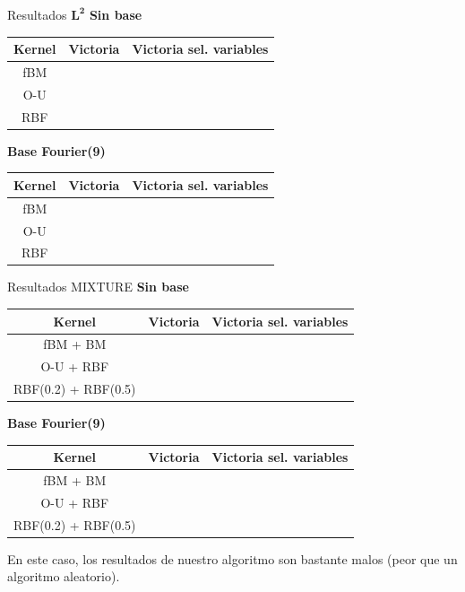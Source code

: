 \documentclass[10pt, spanish, professionalfonts]{beamer}
\newcommand{\cmark}{\ding{51}}%
\newcommand{\xmark}{\ding{55}}%
\begin{document}
\begin{frame}{Resultados \(\boldsymbol{L^2}\)}
\textbf{Sin base}
  \begin{table}
    \begin{tabular}{c|cc}
      Kernel & Victoria & Victoria sel. variables \\ \hline
      fBM & \xmark & \xmark\\
      O-U & \cmark & \xmark\\
      RBF & \cmark & \cmark
    \end{tabular}
  \end{table}

  \textbf{Base Fourier(9)}
  \begin{table}
    \begin{tabular}{c|cc}
      Kernel & Victoria & Victoria sel. variables \\ \hline
      fBM & \xmark &  \cmark\\
      O-U & \xmark & \cmark\\
      RBF & \cmark & \cmark
    \end{tabular}
  \end{table}
\end{frame}

\begin{frame}{Resultados MIXTURE}
\textbf{Sin base}
  \begin{table}
    \begin{tabular}{c|cc}
      Kernel & Victoria & Victoria sel. variables \\ \hline
      fBM + BM & \xmark & \xmark\\
      O-U + RBF & \xmark & \xmark\\
      RBF(0.2) + RBF(0.5) & \xmark & \xmark
    \end{tabular}
  \end{table}

  \textbf{Base Fourier(9)}
  \begin{table}
    \begin{tabular}{c|cc}
      Kernel & Victoria & Victoria sel. variables \\ \hline
      fBM + BM & \xmark &  \xmark\\
      O-U + RBF & \xmark & \xmark\\
      RBF(0.2) + RBF(0.5) & \xmark & \cmark
    \end{tabular}
  \end{table}

  En este caso, los resultados de nuestro algoritmo son bastante malos (peor que un algoritmo aleatorio).
\end{frame}
\end{document}
